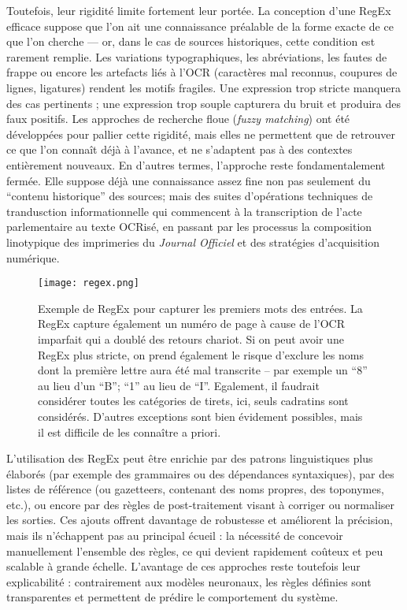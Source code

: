 Toutefois, leur rigidité limite fortement leur portée. La conception d’une RegEx efficace suppose que l’on ait une connaissance préalable de la forme exacte de ce que l’on cherche — or, dans le cas de sources historiques, cette condition est rarement remplie. Les variations typographiques, les abréviations, les fautes de frappe ou encore les artefacts liés à l’OCR (caractères mal reconnus, coupures de lignes, ligatures) rendent les motifs fragiles. Une expression trop stricte manquera des cas pertinents ; une expression trop souple capturera du bruit et produira des faux positifs. Les approches de recherche floue (\emph{fuzzy matching}) ont été développées pour pallier cette rigidité, mais elles ne permettent que de retrouver ce que l’on connaît déjà à l’avance, et ne s’adaptent pas à des contextes entièrement nouveaux. En d’autres termes, l’approche reste fondamentalement fermée. Elle suppose déjà une connaissance assez fine non pas seulement du \enquote{contenu historique} des sources; mais des suites d'opérations techniques de trandusction informationnelle qui commencent à la transcription de l'acte parlementaire au texte OCRisé, en passant par les processus la composition linotypique des imprimeries du \emph{Journal Officiel} et des stratégies d'acquisition numérique.

\begin{figure}[htbp]
\centering
\texttt{[image: regex.png]}
\caption{Exemple de RegEx pour capturer les premiers mots des entrées. La RegEx capture également un numéro de page à cause de l'OCR imparfait qui a doublé des retours chariot. Si on peut avoir une RegEx plus stricte, on prend également le risque d'exclure les noms dont la première lettre aura été mal transcrite -- par exemple un \enquote{8} au lieu d'un \enquote{B}; \enquote{1} au lieu de \enquote{I}. Egalement, il faudrait considérer toutes les catégories de tirets, ici, seuls cadratins sont considérés. D'autres exceptions sont bien évidement possibles, mais il est difficile de les connaître a priori.}
\label{fig:regex}
\end{figure}

L’utilisation des RegEx peut être enrichie par des patrons linguistiques plus élaborés (par exemple des grammaires ou des dépendances syntaxiques), par des listes de référence (ou gazetteers, contenant des noms propres, des toponymes, etc.), ou encore par des règles de post-traitement visant à corriger ou normaliser les sorties. Ces ajouts offrent davantage de robustesse et améliorent la précision, mais ils n’échappent pas au principal écueil : la nécessité de concevoir manuellement l’ensemble des règles, ce qui devient rapidement coûteux et peu scalable à grande échelle. L’avantage de ces approches reste toutefois leur explicabilité : contrairement aux modèles neuronaux, les règles définies sont transparentes et permettent de prédire le comportement du système.

